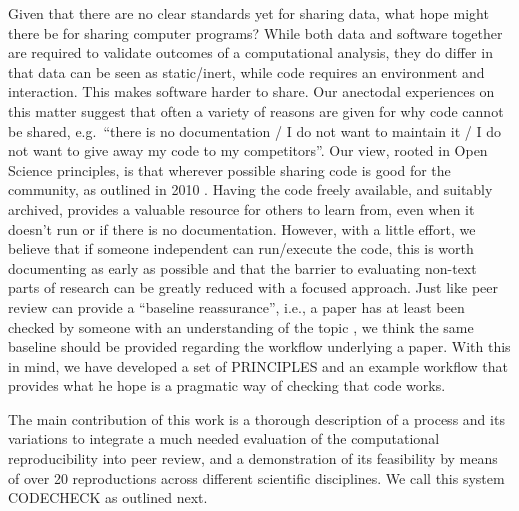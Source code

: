 \documentclass[12pt]{article}
\begin{document}
Given that there are no clear standards yet for sharing data, what hope
might there be for sharing computer programs? While both data and software
together are required to validate outcomes of a computational analysis,
they do differ in  that data can be seen as static/inert,
while code requires an environment and interaction. This makes 
software harder to share.
Our anectodal experiences
on this matter suggest that often a variety of reasons are given for why
code cannot be shared, e.g.~``there is no documentation / I do not
want to maintain it / I do not want to give away my code to my
competitors''. Our view, rooted in Open Science principles, is that
wherever possible sharing code is good for the community, as outlined
in 2010 \cite{Barnes2010-iv}. Having the code freely available, and
suitably archived, provides a valuable resource for others to learn
from, even when it doesn't run or if there is no documentation. However,
with a little effort, we believe that if someone independent can run/execute
the code, this is worth documenting as early as possible and that the barrier
to evaluating non-text parts of research can be greatly reduced with a 
focused approach.
Just like peer review can provide a ``baseline reassurance'', i.e., a paper
has at least been checked by someone with an understanding of the topic
\cite{fyfe_mission_2019}, we think the same baseline should be provided
regarding the workflow underlying a paper.
With this in mind, we have developed a set of PRINCIPLES and an example 
workflow that provides what he hope is a pragmatic way of checking that 
code works.

The main contribution of this work is a thorough description of a process
and its variations to integrate a much needed evaluation of the 
computational reproducibility \cite{barba_terminologies_2018} into peer
review, and a demonstration of its feasibility by means of over 20
reproductions across different scientific disciplines.
We call this system CODECHECK as outlined next.
\end{document}
